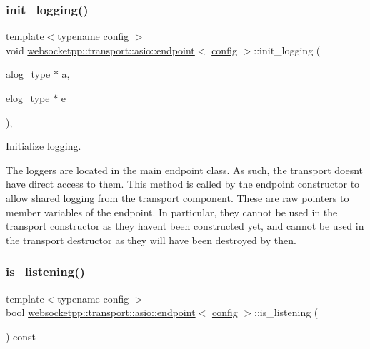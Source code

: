 \subsubsection{\texorpdfstring{init\+\_\+logging()}{init\_logging()}}
{\footnotesize\ttfamily template$<$typename config $>$ \\
void \mbox{\hyperlink{classwebsocketpp_1_1transport_1_1asio_1_1endpoint}{websocketpp\+::transport\+::asio\+::endpoint}}$<$ \mbox{\hyperlink{classconfig}{config}} $>$\+::init\+\_\+logging (\begin{DoxyParamCaption}\item[{\mbox{\hyperlink{classwebsocketpp_1_1transport_1_1asio_1_1endpoint_acba708e66a47d4aae9a053d364585b81}{alog\+\_\+type}} $\ast$}]{a,  }\item[{\mbox{\hyperlink{classwebsocketpp_1_1transport_1_1asio_1_1endpoint_a2aa93730c801602b55b585121a2898c0}{elog\+\_\+type}} $\ast$}]{e }\end{DoxyParamCaption})\hspace{0.3cm}{\ttfamily [inline]}, {\ttfamily [protected]}}



Initialize logging. 

The loggers are located in the main endpoint class. As such, the transport doesn\textquotesingle{}t have direct access to them. This method is called by the endpoint constructor to allow shared logging from the transport component. These are raw pointers to member variables of the endpoint. In particular, they cannot be used in the transport constructor as they haven\textquotesingle{}t been constructed yet, and cannot be used in the transport destructor as they will have been destroyed by then. \mbox{\label{classwebsocketpp_1_1transport_1_1asio_1_1endpoint_af33506cbd90a184cdf1a0424ec2d0619}} 
\subsubsection{\texorpdfstring{is\+\_\+listening()}{is\_listening()}}
{\footnotesize\ttfamily template$<$typename config $>$ \\
bool \mbox{\hyperlink{classwebsocketpp_1_1transport_1_1asio_1_1endpoint}{websocketpp\+::transport\+::asio\+::endpoint}}$<$ \mbox{\hyperlink{classconfig}{config}} $>$\+::is\+\_\+listening (\begin{DoxyParamCaption}{ }\end{DoxyParamCaption}) const\hspace{0.3cm}{\ttfamily [inline]}}



